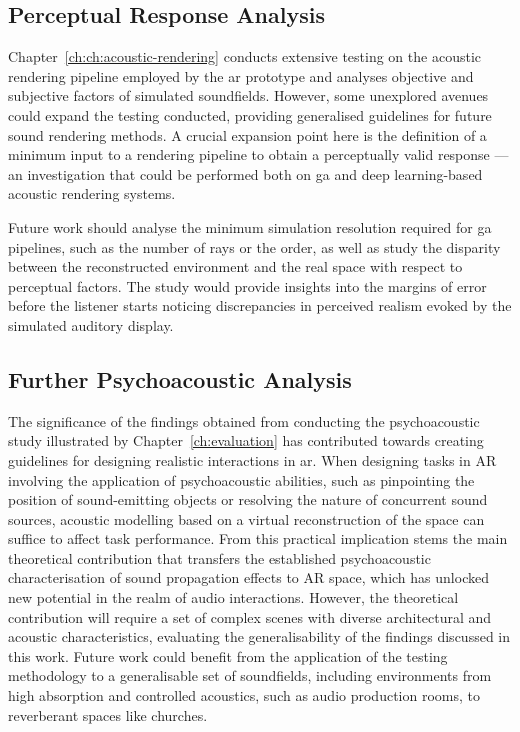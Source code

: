 \subsection{Perceptual Response Analysis}
Chapter~\ref{ch:ch:acoustic-rendering} conducts extensive testing on the acoustic rendering pipeline employed by the \acrshort{ar} prototype and analyses objective and subjective factors of simulated soundfields. However, some unexplored avenues could expand the testing conducted, providing generalised guidelines for future sound rendering methods. A crucial expansion point here is the definition of a minimum input to a rendering pipeline to obtain a perceptually valid response --- an investigation that could be performed both on \acrshort{ga} and deep learning-based acoustic rendering systems.\par
Future work should analyse the minimum simulation resolution required for \acrshort{ga} pipelines, such as the number of rays or the order, as well as study the disparity between the reconstructed environment and the real space with respect to perceptual factors. The study would provide insights into the margins of error before the listener starts noticing discrepancies in perceived realism evoked by the simulated auditory display.\par

\subsection{Further Psychoacoustic Analysis}
The significance of the findings obtained from conducting the psychoacoustic study illustrated by Chapter~\ref{ch:evaluation} has contributed towards creating guidelines for designing realistic interactions in \acrshort{ar}. When designing tasks in AR involving the application of psychoacoustic abilities, such as pinpointing the position of sound-emitting objects or resolving the nature of concurrent sound sources, acoustic modelling based on a virtual reconstruction of the space can suffice to affect task performance. From this practical implication stems the main theoretical contribution that transfers the established psychoacoustic characterisation of sound propagation effects to AR space, which has unlocked new potential in the realm of audio interactions. However, the theoretical contribution will require a set of complex scenes with diverse architectural and acoustic characteristics, evaluating the generalisability of the findings discussed in this work. Future work could benefit from the application of the testing methodology to a generalisable set of soundfields, including environments from high absorption and controlled acoustics, such as audio production rooms, to reverberant spaces like churches.\par



